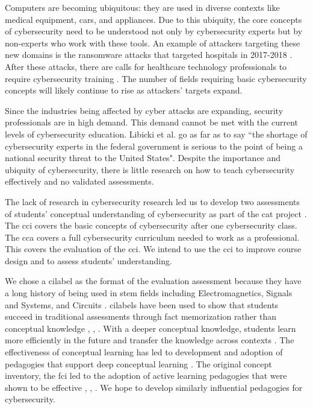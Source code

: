 Computers are becoming ubiquitous: they are used in diverse contexts like medical equipment, cars, and appliances. Due to this ubiquity, the core concepts of cybersecurity need to be understood not only by cybersecurity experts but by non-experts who work with these tools. An example of attackers targeting these new domains is the ransomware attacks that targeted hospitals in 2017-2018 \cite{ransomware}. After these attacks, there are calls for healthcare technology professionals to require cybersecurity training \cite{htm}. The number of fields requiring basic cybersecurity concepts will likely continue to rise as attackers' targets expand.

Since the industries being affected by cyber attacks are expanding, security professionals are in high demand. This demand cannot be met with the current levels of cybersecurity education. Libicki et al. \cite{hackers_wanted} go as far as to say ``the shortage of cybersecurity experts in the federal government is serious to the point of being a national security threat to the United States". Despite the importance and ubiquity of cybersecurity, there is little research on how to teach cybersecurity effectively and no validated assessments. 


The lack of research in cybersecurity research led us to develop two assessments of students' conceptual understanding of cybersecurity as part of the \gls{cat} project \cite{workforce}. The \gls{cci} covers the basic concepts of cybersecurity after one cybersecurity class. The \gls{cca} covers a full cybersecurity curriculum needed to work as a professional. This \DocTitle covers the evaluation of the \gls{cci}. We intend to use the \gls{cci} to improve course design and to assess students' understanding.


We chose a \gls{cilabel} as the format of the evaluation assessment because they have a long history of being used in \gls{stem} fields including Electromagnetics, Signals and Systems, and Circuits \cite{ci_progress}. \glspl{cilabel} have been used to show that students succeed in traditional assessments through fact memorization rather than conceptual knowledge \cite{hake}, \cite{fci}, \cite{litzinger}. With a deeper conceptual knowledge, students learn more efficiently in the future and transfer the knowledge across contexts \cite{litzinger}. The effectiveness of conceptual learning has led to development and adoption of pedagogies that support deep conceptual learning \cite{dlci}. The original concept inventory, the \gls{fci} led to the adoption of active learning pedagogies that were shown to be effective \cite{hake}, \cite{fci}, \cite{evans}. We hope to develop similarly influential pedagogies for cybersecurity.



